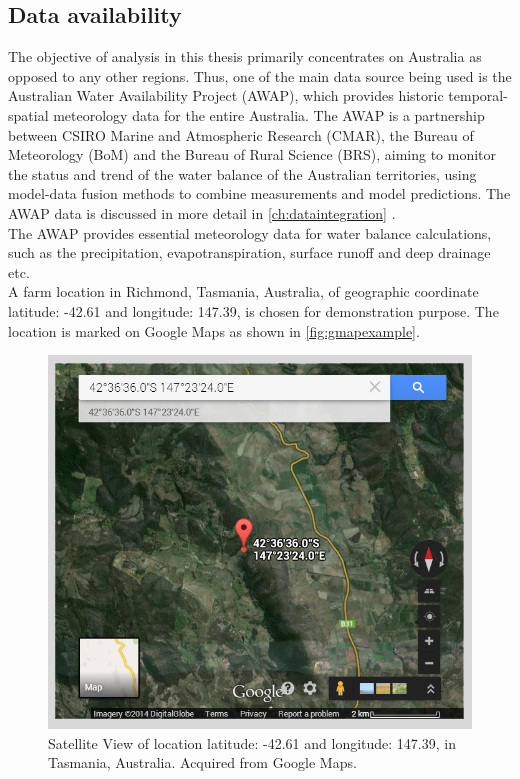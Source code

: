 \subsection{Data availability}
The objective of analysis in this thesis primarily concentrates on Australia as opposed to any other regions. Thus, one of the main data source being used is the Australian Water Availability Project (AWAP), which provides historic temporal-spatial meteorology data for the entire Australia. The AWAP is a partnership between CSIRO Marine and Atmospheric Research (CMAR), the Bureau of Meteorology (BoM) and the Bureau of Rural Science (BRS), aiming to monitor the status and trend of the water balance of the Australian territories, using model-data fusion methods to combine measurements and model predictions. The AWAP data is discussed in more detail in \autoref{ch:dataintegration} .\\
\newline
The AWAP provides essential meteorology data for water balance calculations, such as the precipitation, evapotranspiration, surface runoff and deep drainage etc.\\
\newline
A farm location in Richmond, Tasmania, Australia, of geographic coordinate latitude: -42.61 and longitude: 147.39, is chosen for demonstration purpose. The location is marked on Google Maps\citep{Google2014} as shown in \autoref{fig:gmapexample}.\\
\begin{figure}[hbt]
\begin{center}
\includegraphics[width=0.75\linewidth]{gfx/gmapexample}
\end{center}
\caption{Satellite View of location latitude: -42.61 and longitude: 147.39, in Tasmania, Australia. Acquired from Google Maps.}
\label{fig:gmapexample}
\end{figure}
